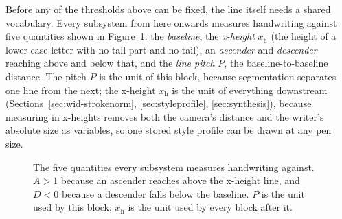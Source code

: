 Before any of the thresholds above can be fixed, the line itself needs a shared vocabulary. Every subsystem from here onwards measures handwriting against five quantities shown in Figure~\ref{fig:seg-geom}: the \emph{baseline}, the \emph{x-height} $x_{\mathrm h}$ (the height of a lower-case letter with no tall part and no tail), an \emph{ascender} and \emph{descender} reaching above and below that, and the \emph{line pitch} $P$, the baseline-to-baseline distance. The pitch $P$ is the unit of this block, because segmentation separates one line from the next; the x-height $x_{\mathrm h}$ is the unit of everything downstream (Sections~\ref{sec:wid-strokenorm}, \ref{sec:styleprofile}, \ref{sec:synthesis}), because measuring in x-heights removes both the camera's distance and the writer's absolute size as variables, so one stored style profile can be drawn at any pen size.

\begin{figure}[h]
\centering
{}
\caption{The five quantities every subsystem measures handwriting against. $A>1$ because an ascender reaches above the x-height line, and $D<0$ because a descender falls below the baseline. $P$ is the unit used by this block; $x_{\mathrm h}$ is the unit used by every block after it.}
\label{fig:seg-geom}
\end{figure}

